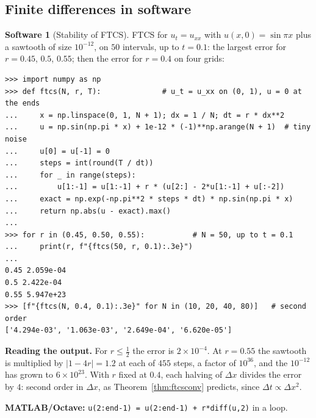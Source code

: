 \documentclass[11pt,a4paper]{article}
\numberwithin{equation}{section}
\theoremstyle{definition}
\newtheorem{software}[thm]{Software}
\begin{document}
\subsection{Finite differences in software}
\label{ssec:software13}

\begin{software}[Stability of FTCS]
\label{sw:ftcs}
FTCS for $u_t = u_{xx}$ with $u(x, 0) = \sin\pi x$ plus a sawtooth of size $10^{-12}$, on $50$ intervals, up to $t = 0.1$: the largest error for $r = 0.45$, $0.5$, $0.55$; then the error for $r = 0.4$ on four grids:
{\small\begin{verbatim}
>>> import numpy as np
>>> def ftcs(N, r, T):              # u_t = u_xx on (0, 1), u = 0 at the ends
...     x = np.linspace(0, 1, N + 1); dx = 1 / N; dt = r * dx**2
...     u = np.sin(np.pi * x) + 1e-12 * (-1)**np.arange(N + 1)  # tiny noise
...     u[0] = u[-1] = 0
...     steps = int(round(T / dt))
...     for _ in range(steps):
...         u[1:-1] = u[1:-1] + r * (u[2:] - 2*u[1:-1] + u[:-2])
...     exact = np.exp(-np.pi**2 * steps * dt) * np.sin(np.pi * x)
...     return np.abs(u - exact).max()
...
>>> for r in (0.45, 0.50, 0.55):           # N = 50, up to t = 0.1
...     print(r, f"{ftcs(50, r, 0.1):.3e}")
...
0.45 2.059e-04
0.5 2.422e-04
0.55 5.947e+23
>>> [f"{ftcs(N, 0.4, 0.1):.3e}" for N in (10, 20, 40, 80)]   # second order
['4.294e-03', '1.063e-03', '2.649e-04', '6.620e-05']
\end{verbatim}}
\textbf{Reading the output.} For $r \leq \frac12$ the error is $2 \times 10^{-4}$. At $r = 0.55$ the sawtooth is multiplied by $|1 - 4r| = 1.2$ at each of $455$ steps, a factor of $10^{36}$, and the $10^{-12}$ has grown to $6 \times 10^{23}$. With $r$ fixed at $0.4$, each halving of $\Delta x$ divides the error by $4$: second order in $\Delta x$, as
Theorem~\ref{thm:ftcsconv} predicts, since $\Delta t \propto \Delta x^2$.

\textbf{MATLAB/Octave:} \texttt{u(2:end-1) = u(2:end-1) + r*diff(u,2)} in a loop.
\end{software}
\end{document}
